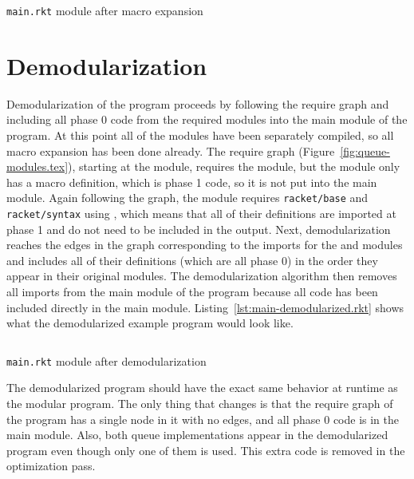 \begin{listing}[tb]
  \inputminted{racket}{listings/main-expanded.rkt}
  \caption{\texttt{main.rkt} module after macro expansion}
  \label{lst:main-expanded.rkt}
\end{listing}


\section{Demodularization}

Demodularization of the program proceeds by following the require graph and including all phase 0 code from the required modules into the main module of the program. 
At this point all of the modules have been separately compiled, so all macro expansion has been done already.
The require graph (Figure~\ref{fig:queue-modules.tex}), starting at the  module, requires the  module, but the  module only has a macro definition, which is phase 1 code, so it is not put into the main module.
Again following the graph, the  module requires \texttt{racket/base} and \texttt{racket/syntax} using , which means that all of their definitions are imported at phase 1 and do not need to be included in the output. 
Next, demodularization reaches the edges in the graph corresponding to the imports for the  and  modules and includes all of their definitions (which are all phase 0) in the order they appear in their original modules.
The demodularization algorithm then removes all imports from the main module of the program because all code has been included directly in the main module.
Listing~\ref{lst:main-demodularized.rkt} shows what the demodularized example program would look like.

\begin{listing}[tb]
  \inputminted{racket}{listings/main-demodularized.rkt}
  \caption{\texttt{main.rkt} module after demodularization}
  \label{lst:main-demodularized.rkt}
\end{listing}

The demodularized program should have the exact same behavior at runtime as the modular program.
The only thing that changes is that the require graph of the program has a single node in it with no edges, and all phase 0 code is in the main module. 
Also, both queue implementations appear in the demodularized program even though only one of them is used.
This extra code is removed in the optimization pass.

